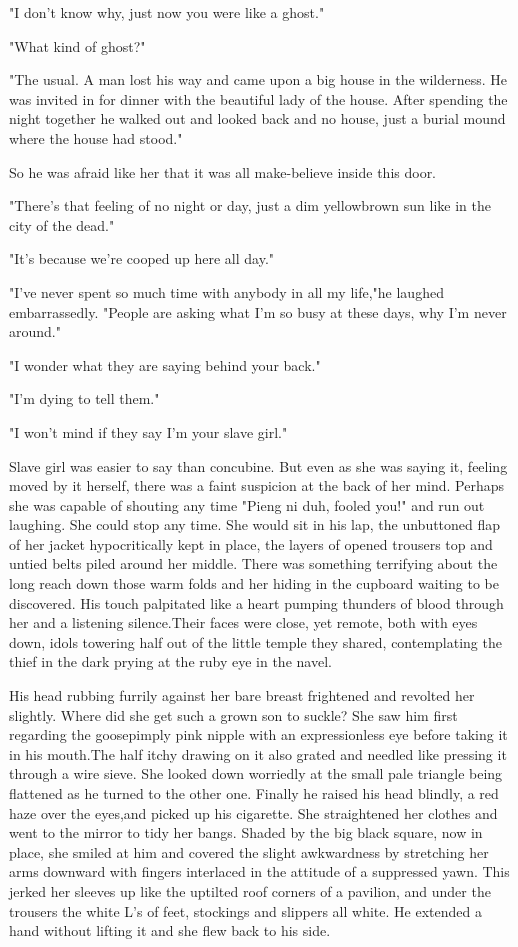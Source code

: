 \par "I don't know why, just now you were like a ghost."
\par "What kind of ghost?"
\par "The usual. A man lost his way and came upon a big house in the wilderness. He was invited in for dinner with the beautiful lady of the house. After spending the night together he walked out and looked back and no house, just a burial mound where the house had stood."
\par So he was afraid like her that it was all make-believe inside this door.
\par "There's that feeling of no night or day, just a dim yellowbrown sun like in the city of the dead."
\par "It's because we're cooped up here all day."
\par "I've never spent so much time with anybody in all my life,"he laughed embarrassedly. "People are asking what I'm so busy at these days, why I'm never around."
\par "I wonder what they are saying behind your back."
\par "I'm dying to tell them."
\par "I won't mind if they say I'm your slave girl."
\par Slave girl was easier to say than concubine. But even as she was saying it, feeling moved by it herself, there was a faint suspicion at the back of her mind. Perhaps she was capable of shouting any time "Pieng ni duh, fooled you!" and run out laughing. She could stop any time. She would sit in his lap, the unbuttoned flap of her jacket hypocritically kept in place, the layers of opened trousers top and untied belts piled around her middle. There was something terrifying about the long reach down those warm folds and her hiding in the cupboard waiting to be discovered. His touch palpitated like a heart pumping thunders of blood through her and a listening silence.Their faces were close, yet remote, both with eyes down, idols towering half out of the little temple they shared, contemplating the thief in the dark prying at the ruby eye in the navel.
\par His head rubbing furrily against her bare breast frightened and revolted her slightly. Where did she get such a grown son to suckle? She saw him first regarding the goosepimply pink nipple with an expressionless eye before taking it in his mouth.The half itchy drawing on it also grated and needled like pressing it through a wire sieve. She looked down worriedly at the small pale triangle being flattened as he turned to the other one. Finally he raised his head blindly, a red haze over the eyes,and picked up his cigarette. She straightened her clothes and went to the mirror to tidy her bangs. Shaded by the big black square, now in place, she smiled at him and covered the slight awkwardness by stretching her arms downward with fingers interlaced in the attitude of a suppressed yawn. This jerked her sleeves up like the uptilted roof corners of a pavilion, and under the trousers the white L's of feet, stockings and slippers all white. He extended a hand without lifting it and she flew back to his side.
